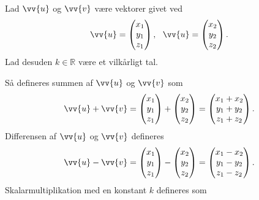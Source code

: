 \begin{defn}
	Lad $\vv{u}$ og $\vv{v}$ være vektorer givet ved
	\begin{align*}
		\vv{u} =
		\begin{pmatrix}
			x_1 \\ y_1 \\ z_1	
		\end{pmatrix}, \ \ \vv{u} =
		\begin{pmatrix}
			x_2 \\ y_2 \\ z_2
		\end{pmatrix}.
	\end{align*}
	Lad desuden $k\in \mathbb{R}$ være et vilkårligt tal. 
	
	Så defineres summen af $\vv{u}$ og $\vv{v}$ som 
	\begin{align*}
		\vv{u} + \vv{v} =
		\begin{pmatrix}
			x_1 \\ y_1 \\ z_1
		\end{pmatrix} +
		\begin{pmatrix}
			x_2 \\ y_2 \\ z_2
		\end{pmatrix} =
		\begin{pmatrix}
			x_1 + x_2 \\
			y_1 + y_2 \\
			z_1 + z_2
		\end{pmatrix}.
	\end{align*}	 
	Differensen af $\vv{u}$ og $\vv{v}$ defineres
	\begin{align*}
		\vv{u}-\vv{v} =
		\begin{pmatrix}
			x_1 \\ y_1 \\ z_1
		\end{pmatrix} -
		\begin{pmatrix}
			x_2 \\ y_2 \\ z_2
		\end{pmatrix} =
		\begin{pmatrix}
			x_1 - x_2 \\
			y_1 - y_2 \\
			z_1 - z_2
		\end{pmatrix}.
	\end{align*}
	Skalarmultiplikation med en konstant $k$ defineres som
	\begin{align*}

\end{align*}
\end{defn}
